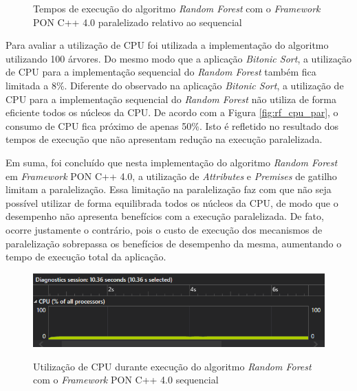 \begin{figure}[!htb]
\centering
{}
\caption{Tempos de execução do algoritmo \textit{Random
Forest} com o \textit{Framework} PON C++ 4.0 paralelizado relativo ao sequencial}
\label{fig:random_forest_rel}
\end{figure}

Para avaliar a utilização de CPU foi utilizada a implementação do algoritmo
utilizando 100 árvores. Do mesmo modo que a aplicação \textit{Bitonic Sort}, a
utilização de CPU para a implementação sequencial do \textit{Random Forest}
também fica limitada a 8\%. Diferente do observado na aplicação \textit{Bitonic
Sort}, a utilização de CPU para a implementação sequencial do \textit{Random
Forest} não utiliza de forma eficiente todos os núcleos da CPU. De acordo com a
Figura \ref{fig:rf_cpu_par}, o consumo de CPU fica próximo de apenas 50\%. Isto
é refletido no resultado dos tempos de execução que não apresentam redução na
execução paralelizada.

Em suma, foi concluído que nesta implementação do algoritmo \textit{Random
Forest} em \textit{Framework} PON C++ 4.0, a utilização de \textit{Attributes} e
\textit{Premises} de gatilho limitam a paralelização. Essa limitação na
paralelização faz com que não seja possível utilizar de forma equilibrada todos
os núcleos da CPU, de modo que o desempenho não apresenta benefícios com a
execução paralelizada. De fato, ocorre justamente o contrário, pois o custo de
execução dos mecanismos de paralelização sobrepassa os benefícios de desempenho
da  mesma, aumentando o tempo de execução total da aplicação.

\begin{figure}[!htb]
\centering
\caption{Utilização de CPU durante execução do algoritmo \textit{Random Forest}
com o \textit{Framework} PON C++ 4.0 sequencial}
\includegraphics[width=\textwidth]{../figures/cpu_rf.png}
\smallskip
{}
\label{fig:rf_cpu}
\end{figure}

